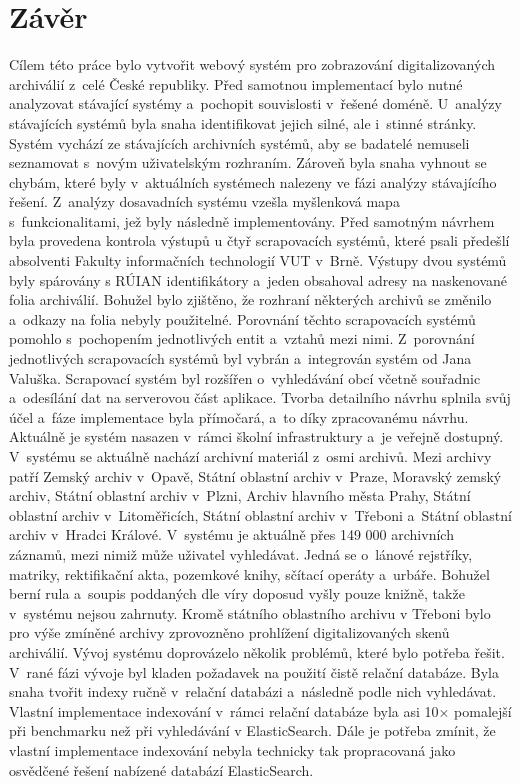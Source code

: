 \chapter{Závěr}
Cílem této práce bylo vytvořit webový systém pro zobrazování digitalizovaných archiválií z~celé České republiky. Před samotnou implementací bylo nutné analyzovat stávající systémy a~pochopit souvislosti v~řešené doméně. U~analýzy stávajících systémů byla snaha identifikovat jejich silné, ale i~stinné stránky. Systém vychází ze stávajících archivních systémů, aby se badatelé nemuseli seznamovat s~novým uživatelským rozhraním. Zároveň byla snaha vyhnout se chybám, které byly v~aktuálních systémech nalezeny ve fázi analýzy stávajícího řešení. Z~analýzy dosavadních systému vzešla myšlenková mapa s~funkcionalitami, jež byly následně implementovány.
\newpara
Před samotným návrhem byla provedena kontrola výstupů u čtyř scrapovacích systémů, které psali předešlí absolventi Fakulty informačních technologií VUT v~Brně. Výstupy dvou systémů byly spárovány s RÚIAN identifikátory a~jeden obsahoval adresy na naskenované folia archiválií. Bohužel bylo zjištěno, že rozhraní některých archivů se změnilo a~odkazy na folia nebyly použitelné. Porovnání těchto scrapovacích systémů pomohlo s~pochopením jednotlivých entit a~vztahů mezi nimi. Z~porovnání jednotlivých scrapovacích systémů byl vybrán a~integrován systém od Jana Valuška. Scrapovací systém byl rozšířen o~vyhledávání obcí včetně souřadnic a~odesílání dat na serverovou část aplikace.
\newpara
 Tvorba detailního návrhu splnila svůj účel a~fáze implementace byla přímočará, a~to díky zpracovanému návrhu.
\newpara
Aktuálně je systém nasazen v~rámci školní infrastruktury a~je veřejně dostupný. V~systému se aktuálně nachází archivní materiál z~osmi archivů. Mezi archivy patří Zemský archiv v~Opavě, Státní oblastní archiv v~Praze, Moravský zemský archiv, Státní oblastní archiv v~Plzni, Archiv hlavního města Prahy, Státní oblastní archiv v~Litoměřicích, Státní oblastní archiv v~Třeboni a~Státní oblastní archiv v~Hradci Králové. V~systému je aktuálně přes 149 000 archivních záznamů, mezi nimiž může uživatel vyhledávat. Jedná se o~lánové rejstříky, matriky, rektifikační akta, pozemkové knihy, sčítací operáty a~urbáře. Bohužel berní rula a~soupis poddaných dle víry doposud vyšly pouze knižně, takže v~systému nejsou zahrnuty. Kromě státního oblastního archivu v Třeboni bylo pro výše zmíněné archivy zprovozněno prohlížení digitalizovaných skenů archiválií.
\newpage
\noindent
Vývoj systému doprovázelo několik problémů, které bylo potřeba řešit. V~rané fázi vývoje byl kladen požadavek na použití čistě relační databáze. Byla snaha tvořit indexy ručně v~relační databázi a~následně podle nich vyhledávat. Vlastní implementace indexování v~rámci relační databáze byla asi 10$\times$ pomalejší při benchmarku než při vyhledávání v ElasticSearch. Dále je potřeba zmínit, že vlastní implementace indexování nebyla technicky tak propracovaná jako osvědčené řešení nabízené databází ElasticSearch. 
